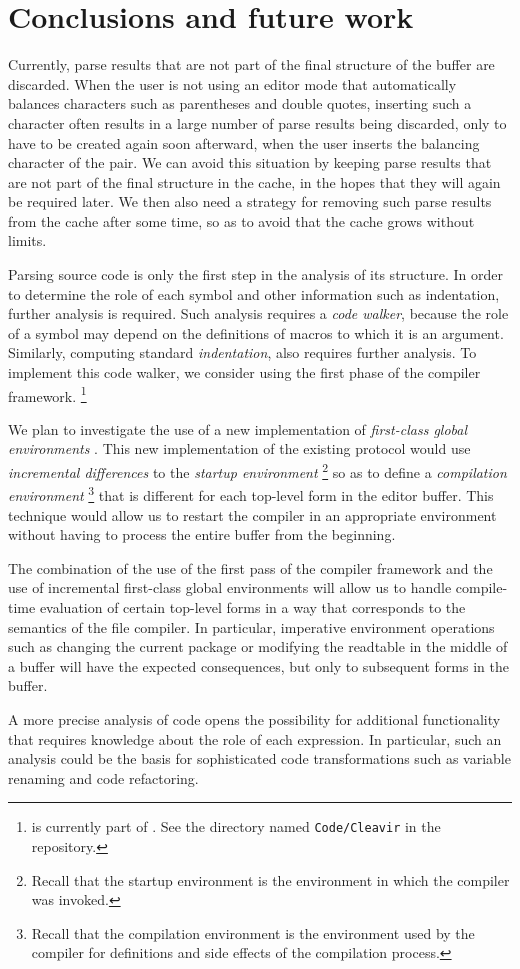 \section{Conclusions and future work}

Currently, parse results that are not part of the final structure of
the buffer are discarded.  When the user is not using an editor mode
that automatically balances characters such as parentheses and double
quotes, inserting such a character often results in a large number of
parse results being discarded, only to have to be created again soon
afterward, when the user inserts the balancing character of the pair.
We can avoid this situation by keeping parse results that are not part
of the final structure in the cache, in the hopes that they will again
be required later.  We then also need a strategy for removing such
parse results from the cache after some time, so as to avoid that the
cache grows without limits.

Parsing \commonlisp{} source code is only the first step in the
analysis of its structure.  In order to determine the role of each
symbol and other information such as indentation, further analysis is
required.  Such analysis requires a \emph{code walker}, because the
role of a symbol may depend on the definitions of macros to which it
is an argument.  Similarly, computing standard
\emph{indentation}, also requires further analysis.  To implement this
code walker, we consider using the first phase of the \cleavir{}
compiler framework.%
\footnote{\cleavir{} is currently part of \sicl{}.  See the directory
  named \texttt{Code/Cleavir} in the \sicl{} repository.}

We plan to investigate the use of a new implementation of
\emph{first-class global environments}
\cite{Strandh:2015:ELS:Environments}.  This new implementation of the
existing \clos{} protocol would use \emph{incremental differences} to
the \emph{startup environment}%
\footnote{Recall that the startup environment is the environment in
  which the compiler was invoked.}
so as to define a \emph{compilation environment}%
\footnote{Recall that the compilation environment is the environment
  used by the compiler for definitions and side effects of the
  compilation process.}
that is different for each top-level form in the editor buffer.  This
technique would allow us to restart the compiler in an appropriate
environment without having to process the entire buffer from the
beginning.

The combination of the use of the first pass of the \cleavir{}
compiler framework and the use of incremental first-class global
environments will allow us to handle compile-time evaluation of
certain top-level forms in a way that corresponds to the semantics of
the file compiler.  In particular, imperative environment operations
such as changing the current package or modifying the readtable in the
middle of a buffer will have the expected consequences, but only to
subsequent forms in the buffer.

A more precise analysis of \commonlisp{} code opens the
possibility for additional functionality that requires knowledge about
the role of each expression.  In particular, such an analysis could be
the basis for sophisticated code transformations such as variable
renaming and code refactoring.
